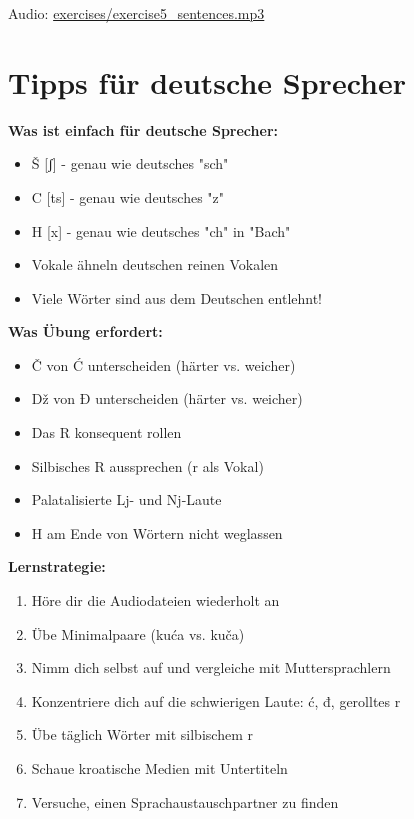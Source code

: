 Audio: \small\url{exercises/exercise5\_sentences.mp3}

\section{Tipps für deutsche Sprecher}

\begin{tcolorbox}[breakable, colback=lightblue!20, colframe=croatianblue, title=\textbf{Spezielle Tipps}]

\textbf{Was ist einfach für deutsche Sprecher:}
\begin{itemize}
    \item Š [ʃ] - genau wie deutsches "sch"
    \item C [ts] - genau wie deutsches "z"
    \item H [x] - genau wie deutsches "ch" in "Bach"
    \item Vokale ähneln deutschen reinen Vokalen
    \item Viele Wörter sind aus dem Deutschen entlehnt!
\end{itemize}

\textbf{Was Übung erfordert:}
\begin{itemize}
    \item Č von Ć unterscheiden (härter vs. weicher)
    \item Dž von Đ unterscheiden (härter vs. weicher)
    \item Das R konsequent rollen
    \item Silbisches R aussprechen (r als Vokal)
    \item Palatalisierte Lj- und Nj-Laute
    \item H am Ende von Wörtern nicht weglassen
\end{itemize}

\textbf{Lernstrategie:}
\begin{enumerate}
    \item Höre dir die Audiodateien wiederholt an
    \item Übe Minimalpaare (kuća vs. kuča)
    \item Nimm dich selbst auf und vergleiche mit Muttersprachlern
    \item Konzentriere dich auf die schwierigen Laute: ć, đ, gerolltes r
    \item Übe täglich Wörter mit silbischem r
    \item Schaue kroatische Medien mit Untertiteln
    \item Versuche, einen Sprachaustauschpartner zu finden
\end{enumerate}

\end{tcolorbox}

